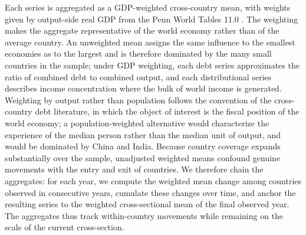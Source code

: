 \documentclass[12pt, titlepage]{article}
\numberwithin{equation}{section}
\begin{document}
Each series is aggregated as a GDP-weighted cross-country mean, with weights
given by output-side real GDP from the Penn World Tables 11.0
\citep{FeenstraInklaarTimmer2015}. The weighting makes the aggregate
representative of the world economy rather than of the average country. An
unweighted mean assigns the same influence to the smallest economies as to
the largest and is therefore dominated by the many small countries in the
sample; under GDP weighting, each debt series approximates the ratio of
combined debt to combined output, and each distributional series describes
income concentration where the bulk of world income is generated. Weighting
by output rather than population follows the convention of the cross-country
debt literature, in which the object of interest is the fiscal position of
the world economy; a population-weighted alternative would characterize the
experience of the median person rather than the median unit of output, and
would be dominated by China and India. Because country coverage expands
substantially over the sample, unadjusted weighted means confound genuine
movements with the entry and exit of countries. We therefore chain the
aggregates: for each year, we compute the weighted mean change among
countries observed in consecutive years, cumulate these changes over time,
and anchor the resulting series to the weighted cross-sectional mean of the
final observed year. The aggregates thus track within-country movements
while remaining on the scale of the current cross-section.
\end{document}
